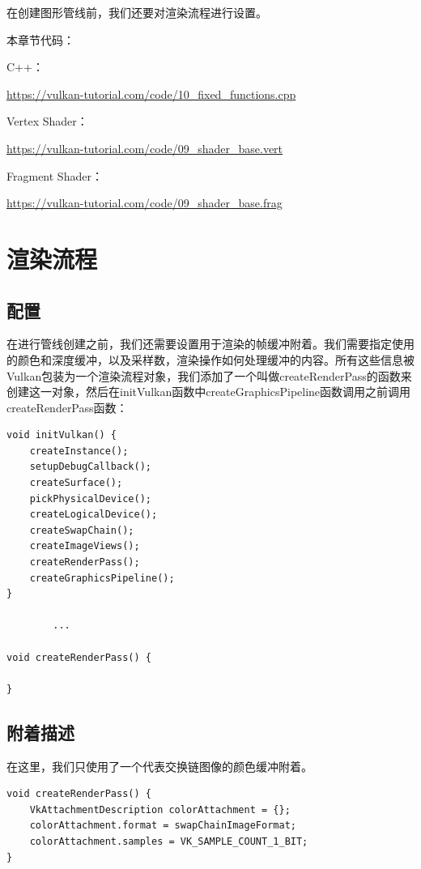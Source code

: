 \documentclass{ctexart}
\begin{document}
在创建图形管线前，我们还要对渲染流程进行设置。

本章节代码：

C++：

\url{https://vulkan-tutorial.com/code/10_fixed_functions.cpp}

Vertex Shader：

\url{https://vulkan-tutorial.com/code/09_shader_base.vert}

Fragment Shader：

\url{https://vulkan-tutorial.com/code/09_shader_base.frag}

\newpage
\section{渲染流程}

\subsection{配置}

在进行管线创建之前，我们还需要设置用于渲染的帧缓冲附着。我们需要指定使用的颜色和深度缓冲，以及采样数，渲染操作如何处理缓冲的内容。所有这些信息被Vulkan包装为一个渲染流程对象，我们添加了一个叫做createRenderPass的函数来创建这一对象，然后在initVulkan函数中createGraphicsPipeline函数调用之前调用createRenderPass函数：

\begin{lstlisting}[language={[ANSI]C}]
void initVulkan() {
	createInstance();
	setupDebugCallback();
	createSurface();
	pickPhysicalDevice();
	createLogicalDevice();
	createSwapChain();
	createImageViews();
	createRenderPass();
	createGraphicsPipeline();
}

		...

void createRenderPass() {

}
\end{lstlisting}

\subsection{附着描述}

在这里，我们只使用了一个代表交换链图像的颜色缓冲附着。

\begin{lstlisting}[language={[ANSI]C}]
void createRenderPass() { 
	VkAttachmentDescription colorAttachment = {};
	colorAttachment.format = swapChainImageFormat;
	colorAttachment.samples = VK_SAMPLE_COUNT_1_BIT;
}
\end{lstlisting}
\end{document}
